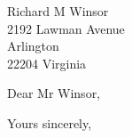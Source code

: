 \documentclass[a4paper,
    pagenumber=false,
    parskip=full,
    fontsize=11pt,
    fromalign=location,
    firstfoot=false,
    fromphone=true,
    fromemail=true,
    fromrule=false,
    foldmarks=false,
    enlargefirstpage,
]{scrlttr2}
\begin{document}
%
\begin{letter}{Richard M Winsor\\
2192 Lawman Avenue\\ 
Arlington\\
22204 Virginia
}
%
\opening{Dear Mr Winsor,}
%
\blindtext[1]
\noindent \blindtext[4]


\closing{Yours sincerely,}
\end{letter}
\end{document}
